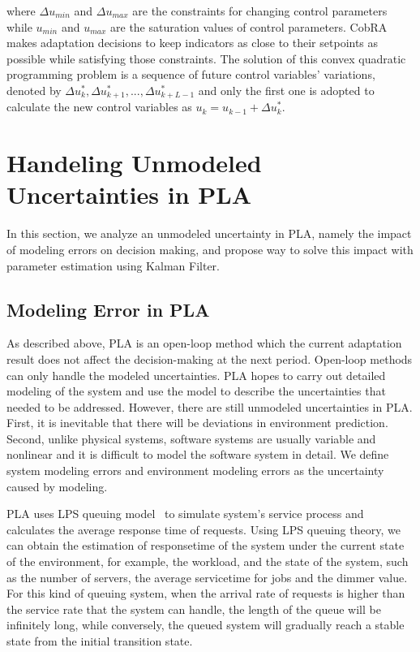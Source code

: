 \documentclass[sigconf]{acmart}
\begin{document}
	\noindent where $\Delta u_{min}$ and $\Delta u_{max}$ are the constraints for changing control parameters while $u_{min}$ and $u_{max}$ are the saturation values of control parameters. CobRA makes adaptation decisions to keep indicators as close to their setpoints as possible while satisfying those constraints.  The solution of this convex quadratic programming problem is a sequence of future control variables' variations, denoted by $\Delta u_k^*,\Delta u_{k+1}^*,...,\Delta u_{k+L-1}^*$ and only the first one is adopted to calculate the new control variables as $u_k=u_{k-1}+\Delta u_k^*$.
	
	\section{Handeling Unmodeled Uncertainties in PLA}
	In this section, we analyze an unmodeled uncertainty in PLA, namely the impact of modeling errors on decision making, and propose way to solve this impact with parameter estimation using Kalman Filter.
	
	\subsection{Modeling Error in PLA}
	As described above, PLA is an open-loop method which the current adaptation result does not affect the decision-making at the next period. Open-loop methods can only handle the modeled uncertainties. PLA hopes to carry out detailed modeling of the system and use the model to describe the uncertainties that needed to be addressed. However, there are still unmodeled uncertainties in PLA. First, it is inevitable that there will be deviations in environment prediction. Second, unlike physical systems, software systems are usually variable and nonlinear and it is difficult to model the software system in detail. We define system modeling errors and environment modeling errors as the uncertainty caused by modeling. 
	
	
	PLA uses LPS queuing model~\cite{zhang2008steady} to simulate system's service process and calculates the average response time of requests. 
	Using LPS queuing theory, we can obtain the estimation of responsetime of the system under the current state of the environment, for example, the workload, and the state of the system, such as the number of servers, the average servicetime for jobs and the dimmer value. 
	For this kind of queuing system, when the arrival rate of requests is higher than the service rate that the system can handle, the length of the queue will be infinitely long, while conversely, the queued system will gradually reach a stable state from the initial transition state. 
	
\end{document}
